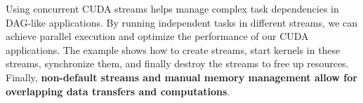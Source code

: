 \noindent
Using concurrent CUDA streams helps manage complex task dependencies in DAG-like applications. By running independent tasks in different streams, we can achieve parallel execution and optimize the performance of our CUDA applications. The example shows how to create streams, start kernels in these streams, synchronize them, and finally destroy the streams to free up resources. Finally, \textbf{non-default streams and manual memory management allow for overlapping data transfers and computations}.
